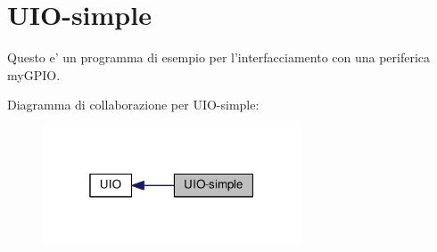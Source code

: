 \hypertarget{group___u_i_o-simple}{\section{U\+I\+O-\/simple}
\label{group___u_i_o-simple}
}


Questo e' un programma di esempio per l'interfacciamento con una periferica my\+G\+P\+I\+O.  


Diagramma di collaborazione per U\+I\+O-\/simple\+:\nopagebreak
\begin{figure}[H]
\begin{center}
\leavevmode
\includegraphics[width=217pt]{group___u_i_o-simple}
\end{center}
\end{figure}
